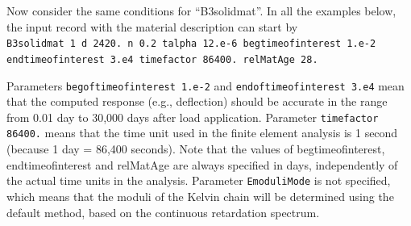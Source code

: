\documentclass[a4paper]{article}
\begin{document}
Now consider the same conditions for ``B3solidmat''.
In all the examples below,
the input record with the material description can start by\\
{\tt B3solidmat 1 d 2420. n 0.2 talpha 12.e-6 begtimeofinterest 1.e-2\\
endtimeofinterest 3.e4 timefactor 86400. relMatAge 28.}

Parameters {\tt begoftimeofinterest 1.e-2} and {\tt endoftimeofinterest 3.e4}
mean that
the computed response (e.g., deflection)
should be accurate in the range from 0.01 day to 30,000 days after load
application. 
Parameter {\tt timefactor 86400.}
means that the time unit used in the finite element analysis
is 1 second (because 1 day = 86,400 seconds). 
Note that the values of begtimeofinterest, endtimeofinterest
and relMatAge are always specified in days, independently of the actual
time units in the analysis. 
Parameter {\tt EmoduliMode} is not specified, which means that the
moduli of the Kelvin chain will be determined using the default method,
based on the continuous retardation spectrum. 
\end{document}
